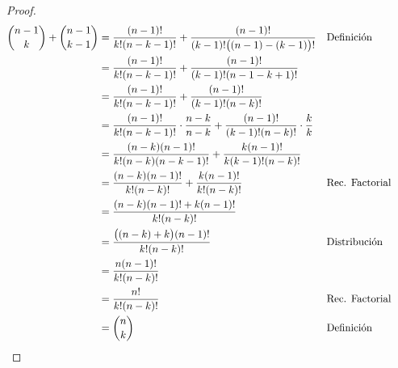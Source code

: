 \begin{enumerate}[label=\alph*)]
\begin{proof}
      \begin{align*}
        \binom{n-1}{k} + \binom{n-1}{k-1} &= \frac{(n-1)!}{k!(n-k-1)!}+ \frac{(n-1)!}{(k-1)!\big((n-1)-(k-1)\big)!} && \text{Definición}\\
        &= \frac{(n-1)!}{k!(n-k-1)!} + \frac{(n-1)!}{(k-1)!(n-1-k+1)!}\\
        &= \frac{(n-1)!}{k!(n-k-1)!} + \frac{(n-1)!}{(k-1)!(n-k)!}\\
        &= \frac{(n-1)!}{k!(n-k-1)!} \cdot \frac{n-k}{n-k} + \frac{(n-1)!}{(k-1)!(n-k)!} \cdot \frac{k}{k}\\
        &= \frac{(n-k)(n-1)!}{k!(n-k)(n-k-1)!} + \frac{k(n-1)!}{k(k-1)!(n-k)!}\\
        &= \frac{(n-k)(n-1)!}{k!(n-k)!} + \frac{k(n-1)!}{k!(n-k)!}&& \text{Rec. Factorial}\\
        &= \frac{(n-k)(n-1)!+k(n-1)!}{k!(n-k)!}\\
        &= \frac{\big((n-k)+k\big)(n-1)!}{k!(n-k)!} && \text{Distribución}\\
        &= \frac{n(n-1)!}{k!(n-k)!}\\
        &= \frac{n!}{k!(n-k)!}&& \text{Rec. Factorial}\\
        &= \binom{n}{k} && \text{Definición} && \qedhere
      \end{align*}
  \end{proof}
  
\clearpage
  

\end{enumerate}
